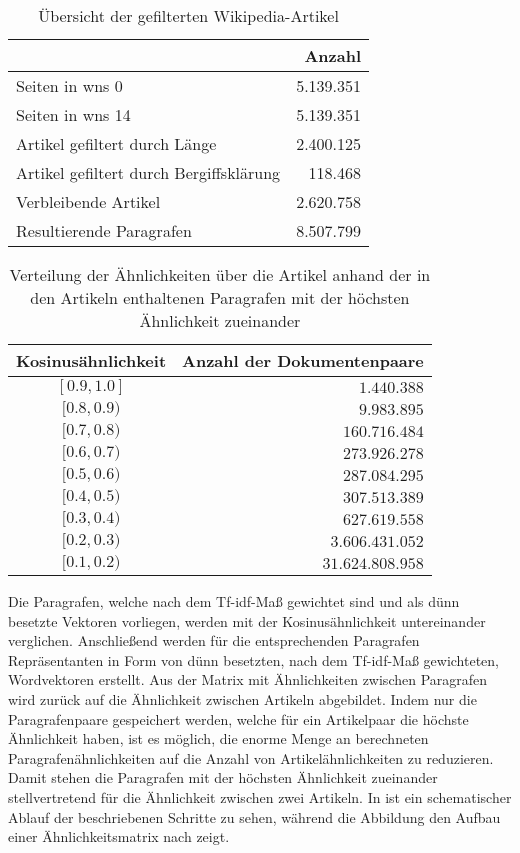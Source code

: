 \begin{table}
\centering
\begin{tabular}{l r}
  \hline
  & Anzahl \\
  \hline
  Seiten in wns 0 & 5.139.351 \\
  Seiten in wns 14 & 5.139.351 \\
  Artikel gefiltert durch Länge & 2.400.125 \\
  Artikel gefiltert durch Bergiffsklärung & 118.468 \\
  Verbleibende Artikel & 2.620.758 \\
  Resultierende Paragrafen & 8.507.799 \\
  \hline
\end{tabular}
\caption{Übersicht der gefilterten Wikipedia-Artikel \cite{licht:2017}}
\label{tab:simMatrix-overview}
\end{table}

\begin{table}
\centering
\begin{tabular}{c r}
  \hline
  Kosinus\"ahnlichkeit & Anzahl der Dokumentenpaare \\
  \hline
  $[0.9,1.0]$ & $1.440.388$\\
  $[0.8,0.9)$ & $9.983.895$\\
  $[0.7,0.8)$ & $160.716.484$\\
  $[0.6,0.7)$ & $273.926.278$\\
  $[0.5,0.6)$ & $287.084.295$\\
  $[0.4,0.5)$ & $307.513.389$\\
  $[0.3,0.4)$ & $627.619.558$\\
  $[0.2,0.3)$ & $3.606.431.052$\\
  $[0.1,0.2)$ & $31.624.808.958$\\
  \hline
\end{tabular}
\caption{Verteilung der Ähnlichkeiten über die Artikel anhand der in den Artikeln enthaltenen Paragrafen mit der höchsten Ähnlichkeit zueinander}
\label{tab:simMatrix-overview-sims}
\end{table}

Die Paragrafen, welche nach dem Tf-idf-Ma{\ss} gewichtet sind und als dünn besetzte Vektoren vorliegen, werden mit der Kosinusähnlichkeit untereinander verglichen.
Anschließend werden für die entsprechenden Paragrafen Repräsentanten in Form von dünn besetzten, nach dem Tf-idf-Maß gewichteten, Wordvektoren erstellt.
Aus der Matrix mit Ähnlichkeiten zwischen Paragrafen wird zurück auf die Ähnlichkeit zwischen Artikeln abgebildet.
Indem nur die Paragrafenpaare gespeichert werden, welche für ein Artikelpaar die höchste Ähnlichkeit haben, ist es möglich, die enorme Menge an berechneten Paragrafenähnlichkeiten auf die Anzahl von Artikelähnlichkeiten zu reduzieren.
Damit stehen die Paragrafen mit der höchsten Ähnlichkeit zueinander stellvertretend für die Ähnlichkeit zwischen zwei Artikeln.
In  ist ein schematischer Ablauf der beschriebenen Schritte zu sehen, während die Abbildung  den Aufbau einer Ähnlichkeitsmatrix nach \cite{licht:2017} zeigt.


